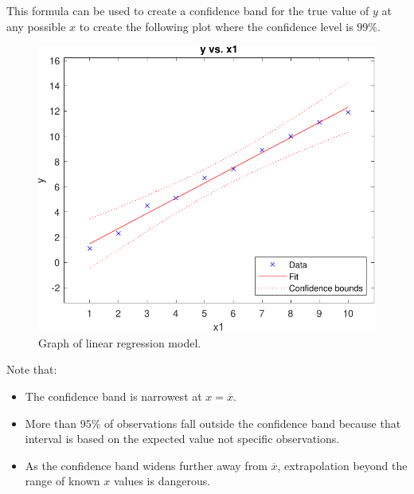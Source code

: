 \documentclass{article}
\begin{document}
This formula can be used to create a confidence band for the true value of
\(y\) at any possible \(x\) to create the following plot where the confidence level is \(99\% \).
\begin{figure}[H]
    \centering
    \includegraphics[width = \linewidth, keepaspectratio = true]{figures/linear_regression}
    \caption{Graph of linear regression model.}
\end{figure}
Note that:
\begin{itemize}
    \item The confidence band is narrowest at \(x = \overline{x}\).
    \item More than \(95\%\) of observations fall outside the confidence band because that interval is based on the expected value not specific observations.
    \item As the confidence band widens further away from \(\overline{x}\), extrapolation beyond the range of known \(x\) values is dangerous.
\end{itemize}
\end{document}
